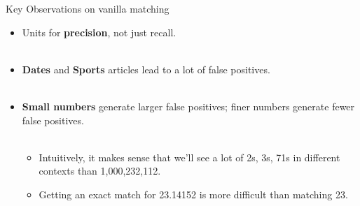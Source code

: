 \documentclass{beamer}
\begin{document}
 \begin{frame}{Key Observations on vanilla matching}
  
  \begin{itemize}
   
   \item Units for \textbf{precision}, not just recall. \\~\\
   
   \item \textbf{Dates} and \textbf{Sports} articles lead to a lot of false positives. \\~\\
   
   \item \textbf{Small numbers} generate larger false positives; finer numbers generate fewer false positives. \\~\\
    \begin{itemize}
      \item Intuitively, it makes sense that we'll see a lot of 2s, 3s, 71s in different contexts than 1,000,232,112. 
      \item Getting an exact match for 23.14152 is more difficult than matching 23. \\~\\
    \end{itemize}
  \end{itemize}
 \end{frame}
\end{document}
